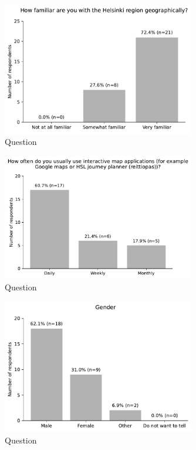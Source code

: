 \begin{figure}[H]
	\centering
	\includegraphics[width=0.75\textwidth]{images/questionnaire/11.pdf}
	\caption{Question}
	\label{fig:architechture}
\end{figure}

\begin{figure}[H]
	\centering
	\includegraphics[width=0.75\textwidth]{images/questionnaire/12.pdf}
	\caption{Question}
	\label{fig:architechture}
\end{figure}

\begin{figure}[H]
	\centering
	\includegraphics[width=0.75\textwidth]{images/questionnaire/13.pdf}
	\caption{Question}
	\label{fig:architechture}
\end{figure}

